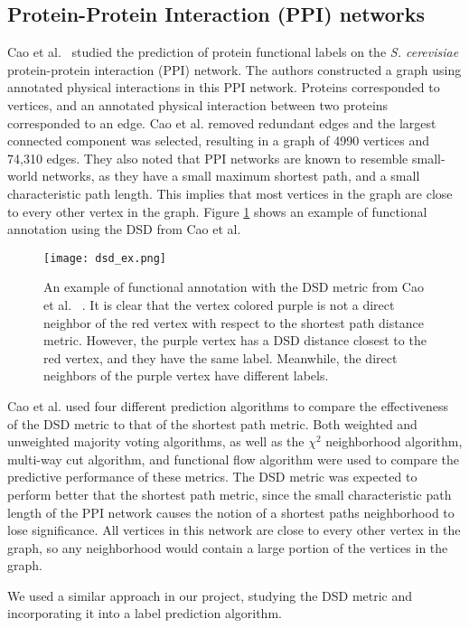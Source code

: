 \subsection{Protein-Protein Interaction (PPI) networks}
Cao et al.~\cite{10.1371/journal.pone.0076339} studied the prediction of protein
functional labels on the \emph{S. cerevisiae} protein-protein interaction (PPI) network. The
authors constructed a graph using annotated physical interactions in this PPI network. Proteins
corresponded to vertices, and an annotated physical interaction between two proteins corresponded to
an edge. Cao et al. removed redundant edges and the largest connected component was selected,
resulting in a graph of 4990 vertices and 74,310 edges. They also noted that PPI networks are known
to resemble small-world networks, as they have a small maximum shortest path, and a small
characteristic path length. This implies that most vertices in the graph are close to every other
vertex in the graph. Figure \ref{fig:PPI_example} shows an example of functional annotation using
the DSD from Cao et al.

\begin{figure}[h] \centering \texttt{[image: dsd\_ex.png]}
\caption{An example of functional annotation with the DSD metric from Cao et al.
~\cite{10.1371/journal.pone.0076339}. It is clear that the vertex colored purple is not a direct
neighbor of the red vertex with respect to the shortest path distance metric. However, the purple
vertex has a DSD distance closest to the red vertex, and they have the same label. Meanwhile, the
direct neighbors of the purple vertex have different labels.}
\label{fig:PPI_example}
\end{figure}

Cao et al. used four different prediction algorithms to compare the effectiveness of the DSD metric
to that of the shortest path metric. Both weighted and unweighted majority voting algorithms, as
well as the $\chi^{2}$ neighborhood algorithm, multi-way cut algorithm, and functional flow
algorithm were used to compare the predictive performance of these metrics. The DSD metric was
expected to perform better that the shortest path metric, since the small characteristic path length
of the PPI network causes the notion of a shortest paths neighborhood to lose significance. All
vertices in this network are close to every other vertex in the graph, so any neighborhood would
contain a large portion of the vertices in the graph.

We used a similar approach in our project, studying the DSD metric and
incorporating it into a label prediction algorithm.

